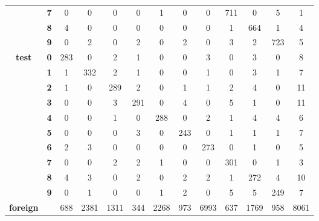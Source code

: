 \begin{table}[htp]
\begin{tabular}{|c|c|c|c|c|c|c|c|c|c|c|c|c|}
		& \textbf{7} & 0          & 0          & 0          & 0          & 1          & 0          & 0          & 711        & 0          & 5          & 1                \\ \cline{2-13} 
		& \textbf{8} & 4          & 0          & 0          & 0          & 0          & 0          & 0          & 1          & 664        & 1          & 4                \\ \cline{2-13} 
		& \textbf{9} & 0          & 2          & 0          & 2          & 0          & 2          & 0          & 3          & 2          & 723        & 5                \\ \hline
		\multirow{10}{*}{\textbf{test}}     & \textbf{0} & 283        & 0          & 2          & 1          & 0          & 0          & 3          & 0          & 3          & 0          & 8                \\ \cline{2-13} 
		& \textbf{1} & 1          & 332        & 2          & 1          & 0          & 0          & 1          & 0          & 3          & 1          & 7                \\ \cline{2-13} 
		& \textbf{2} & 1          & 0          & 289        & 2          & 0          & 1          & 1          & 2          & 4          & 0          & 11               \\ \cline{2-13} 
		& \textbf{3} & 0          & 0          & 3          & 291        & 0          & 4          & 0          & 5          & 1          & 0          & 11               \\ \cline{2-13} 
		& \textbf{4} & 0          & 0          & 1          & 0          & 288        & 0          & 2          & 1          & 4          & 4          & 6                \\ \cline{2-13} 
		& \textbf{5} & 0          & 0          & 0          & 3          & 0          & 243        & 0          & 1          & 1          & 1          & 7                \\ \cline{2-13} 
		& \textbf{6} & 2          & 3          & 0          & 0          & 0          & 0          & 273        & 0          & 1          & 0          & 5                \\ \cline{2-13} 
		& \textbf{7} & 0          & 0          & 2          & 2          & 1          & 0          & 0          & 301        & 0          & 1          & 3                \\ \cline{2-13} 
		& \textbf{8} & 4          & 3          & 0          & 2          & 0          & 2          & 2          & 1          & 272        & 4          & 10               \\ \cline{2-13} 
		& \textbf{9} & 0          & 1          & 0          & 0          & 1          & 2          & 0          & 5          & 5          & 249        & 7                \\ \hline
		\textbf{foreign}                    & \textbf{}  & 688        & 2381       & 1311       & 344        & 2268       & 973        & 6993       & 637        & 1769       & 958        & 8061             \\ \hline
	\end{tabular}
\end{table}

